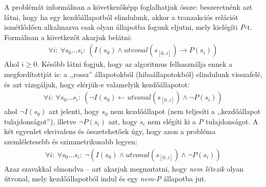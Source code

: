 A problémát informálisan a következőképp foglalhatjuk össze: beszeretnénk azt látni, hogy ha egy kezdőállapotból elindulunk, akkor a tranzakciós relációt ismétlődően alkalmazva csak olyan állapotba fogunk eljutni, mely kielégíti \emph{P}-t. Formálisan a következőt akarjuk belátni:
\begin{align}
	\forall i:~\forall s_{0} \dots s_{i}:~(I(s_{0}) \wedge utvonal(s_{[0..i]}) \rightarrow P(s_{i}))
\end{align}
Ahol $i \geq 0$. Később látni fogjuk, hogy az algoritmus felhasználja ennek a megfordítottját is: a ,,rossz'' állapotokból (hibaállapotokból) elindulunk visszafelé, és azt vizsgáljuk, hogy elérjük-e valamelyik kezdőállapotot:
\begin{align}
	\forall i:~\forall s_{0} \dots s_{i}:~(\neg I(s_{0}) \leftarrow utvonal(s_{[0..i]}) \wedge \neg P(s_{i}))
\end{align}
ahol $\neg I(s_{0})$ azt jelenti, hogy $s_{0}$ nem kezdőállapot (nem teljesíti a ,,kezdőállapot tulajdonságot''), illetve $\neg P(s_{i})$ azt, hogy $s_{i}$ nem elégíti ki a \emph{P} tulajdonságot. A két egyenlet ekvivalens és összetehetőek úgy, hogy azon a probléma szemléletesebb és szimmetrikusabb legyen:
\begin{align}
	\forall i:~\forall s_{0} \dots s_{i}:~\neg(I(s_{0}) \wedge utvonal(s_{[0..i]}) \wedge \neg P(s_{i}))
\end{align}
Azaz szavakkal elmondva -- azt akarjuk megmutatni, hogy \emph{nem létezik} olyan útvonal, mely kezdőállapotból indul és egy \emph{nem-P} állapotba jut.
